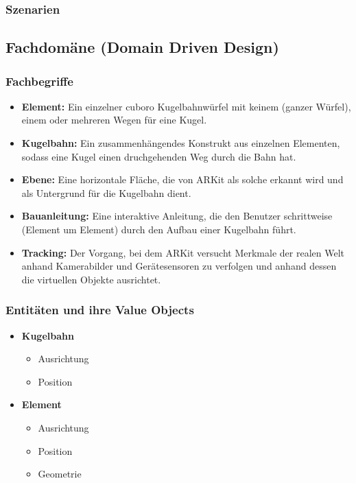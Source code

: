 \subsubsection{Szenarien}

\subsection{Fachdomäne (Domain Driven Design)}

\subsubsection{Fachbegriffe}
\begin{itemize}
	\item \textbf{Element:} Ein einzelner cuboro Kugelbahnwürfel mit keinem (ganzer Würfel), einem oder mehreren Wegen für eine Kugel.
	\item \textbf{Kugelbahn:} Ein zusammenhängendes Konstrukt aus einzelnen Elementen, sodass eine Kugel einen druchgehenden Weg durch die Bahn hat.
	\item \textbf{Ebene:} Eine horizontale Fläche, die von ARKit als solche erkannt wird und als Untergrund für die Kugelbahn dient.
	\item \textbf{Bauanleitung:} Eine interaktive Anleitung, die den Benutzer schrittweise (Element um Element) durch den Aufbau einer Kugelbahn führt.
	\item \textbf{Tracking:} Der Vorgang, bei dem ARKit versucht Merkmale der realen Welt anhand Kamerabilder und Gerätesensoren zu verfolgen und anhand dessen die virtuellen Objekte ausrichtet.
\end{itemize}

\subsubsection{Entitäten und ihre Value Objects}
\begin{itemize}
	\item \textbf{Kugelbahn}
	\begin{itemize}
		\item Ausrichtung
		\item Position
	\end{itemize}
	\item \textbf{Element}
	\begin{itemize}
		\item Ausrichtung
		\item Position
		\item Geometrie
	\end{itemize}
\end{itemize}

